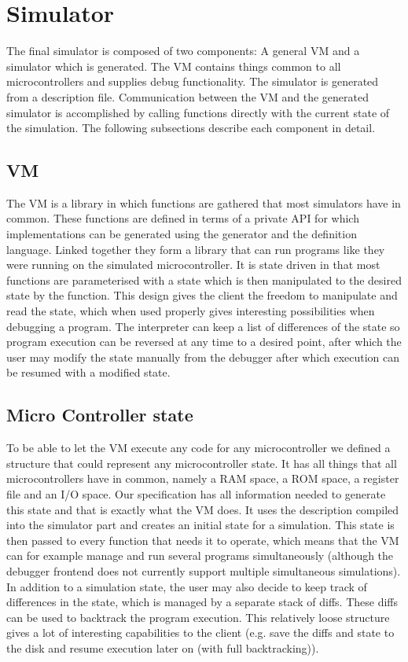 \chapter{Simulator}
The final simulator is composed of two components: A general VM and a
simulator which is generated. The VM contains things common to all 
microcontrollers and supplies debug functionality. The simulator is generated from a description file. Communication between the VM and the generated simulator is accomplished 
by calling functions directly with the current state of the simulation. The following
subsections describe each component in detail.

\section{VM}

The VM is a library in which functions are gathered that most simulators
have in common. These functions are defined in terms of a private API
for which implementations can be generated using the generator and the
definition language. Linked together they form a library that can run
programs like they were running on the simulated microcontroller. It
is state driven in that most functions are parameterised with a state
which is then manipulated to the desired state by the function. This
design gives the client the freedom to manipulate and read the
state, which when used properly gives interesting possibilities when
debugging a program. The interpreter can keep a list of differences of the
state so program execution can be reversed at any time to a desired point,
after which the user may modify the state manually from the debugger after
which execution can be resumed with a modified state.

\section{Micro Controller state}
To be able to let the VM execute any code for any microcontroller we
defined a structure that could represent any microcontroller state. It
has all things that all microcontrollers have in common, namely a RAM space, a
ROM space, a register file and an I/O space.
Our specification has all information needed
to generate this state and that is exactly what the VM does. It uses the
description compiled into the simulator part and creates an initial state for 
a simulation. This state is
then passed to every function that needs it to operate, which means that the 
VM can for example manage and run several programs simultaneously (although
the debugger frontend does not currently support multiple simultaneous
simulations). \\
In addition to a simulation state, the user may also decide to keep track of
differences in the state, which is managed by a separate stack of diffs.
These diffs can be used to backtrack the program execution. This relatively loose structure gives
a lot of interesting capabilities to the client (e.g. save the diffs
and state to the disk and resume execution later on (with
full backtracking)).

